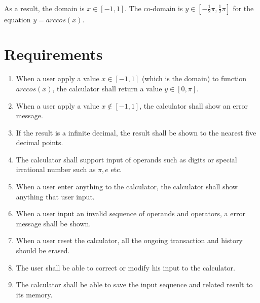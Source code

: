 \documentclass[10pt]{article}
\begin{document}
\paragraph{}
As a result, the domain is $x \in [-1, 1]$. The co-domain is $y \in [-\frac{1}{2}\pi, \frac{1}{2}\pi]$ for the equation $y = arccos(x)$.

\pagebreak
\section{Requirements}
\begin{enumerate}
    \item When a user apply a value $x \in [-1, 1]$ (which is the domain) to function $arccos(x)$, the calculator shall return a value $y\in [0, \pi]$.
    \item When a user apply a value $x \notin [-1, 1]$, the calculator shall show an error message.
    \item If the result is a infinite decimal, the result shall be shown to the nearest five decimal points.
    \item The calculator shall support input of operands such as digits or special irrational number such as $\pi, e$ etc.
    \item When a user enter anything to the calculator, the calculator shall show anything that user input.
    \item When a user input an invalid sequence of operands and operators, a error message shall be shown.
    \item When a user reset the calculator, all the ongoing transaction and history should be erased.
    \item The user shall be able to correct or modify his input to the calculator.
    \item The calculator shall be able to save the input sequence and related result to its memory.
\end{enumerate}

\pagebreak
\end{document}

